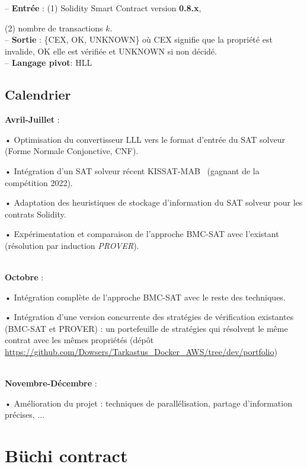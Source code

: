 \documentclass{article}
\begin{document}
-- \textbf{Entrée} : (1) Solidity Smart Contract version \textbf{0.8.x}, 

\hspace{1.72cm} (2) nombre de transactions $k$.\\

-- \textbf{Sortie} : \{CEX, OK, UNKNOWN\} où CEX signifie que la propriété est invalide, OK elle est vérifiée et UNKNOWN si non décidé.\\

-- \textbf{Langage pivot}: HLL


\subsection{Calendrier}

\textbf{Avril-Juillet} :

 • Optimisation du convertisseur LLL vers le format d'entrée du SAT solveur (Forme Normale Conjonctive, CNF).
 
 • Intégration d'un SAT solveur récent KISSAT-MAB~\cite{kissat-mab} (gagnant de la compétition 2022).
 
 • Adaptation des heuristiques de stockage d'information du SAT solveur pour les contrats Solidity.
 
 • Expérimentation et comparaison de l'approche BMC-SAT avec l'existant (résolution par induction \textit{PROVER}).

\hspace{-0.5cm}\\
\textbf{Octobre} :

 • Intégration complète de l'approche BMC-SAT avec le reste des techniques.
 
 • Intégration d'une version concurrente des stratégies de vérification existantes (BMC-SAT et PROVER) : un portefeuille de stratégies qui résolvent le même contrat avec les mêmes propriétés (dépôt \url{https://github.com/Dowsers/Tarkastus_Docker_AWS/tree/dev/portfolio})
 
 \hspace{-0.5cm}\\
\textbf{Novembre-Décembre} :

 • Amélioration du projet : techniques de parallélisation, partage d'information précises, ... 

\newpage

\section{Büchi contract}
\end{document}
